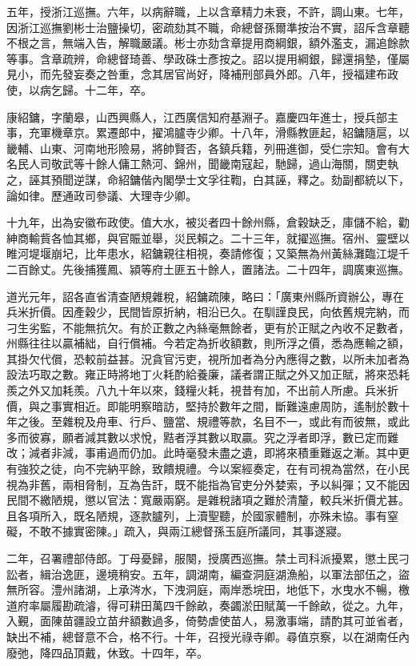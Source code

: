 \begin{pinyinscope}
五年，授浙江巡撫。六年，以病辭職，上以含章精力未衰，不許，調山東。七年，因浙江巡撫劉彬士治鹽操切，密疏劾其不職，命總督孫爾準按治不實，詔斥含章聽不根之言，無端入告，解職嚴議。彬士亦劾含章提用商綱銀，額外濫支，漏追餘款等事。含章疏辨，命總督琦善、學政硃士彥按之。詔以提用綱銀，歸還捐墊，僅屬見小，而先發妄奏之咎重，念其居官尚好，降補刑部員外郎。八年，授福建布政使，以病乞歸。十二年，卒。

康紹鏞，字蘭皋，山西興縣人，江西廣信知府基淵子。嘉慶四年進士，授兵部主事，充軍機章京。累遷郎中，擢鴻臚寺少卿。十八年，滑縣教匪起，紹鏞隨扈，以畿輔、山東、河南地形險易，將帥賢否，各鎮兵籍，列冊進御，受仁宗知。會有大名民人司敬武等十餘人傭工熱河、錦州，聞畿南寇起，馳歸，過山海關，關吏執之，誣其預聞逆謀，命紹鏞偕內閣學士文孚往鞫，白其誣，釋之。劾副都統以下，論如律。歷通政司參議、大理寺少卿。

十九年，出為安徽布政使。值大水，被災者四十餘州縣，倉穀缺乏，庫儲不給，勸紳商輸貲各恤其鄉，與官賑並舉，災民賴之。二十三年，就擢巡撫。宿州、靈壁以睢河堤堰崩圮，比年患水，紹鏞親往相視，奏請修復；又築無為州黃絲灘臨江堤千二百餘丈。先後捕獲鳳、潁等府土匪五十餘人，置諸法。二十四年，調廣東巡撫。

道光元年，詔各直省清查陋規雜稅，紹鏞疏陳，略曰：「廣東州縣所資辦公，專在兵米折價。因產穀少，民間皆原折納，相沿已久。在馴謹良民，向依舊規完納，而刁生劣監，不能無抗欠。有於正數之內絲毫無餘者，更有於正賦之內收不足數者，州縣往往以贏補絀，自行償補。今若定為折收額數，則所浮之價，悉為應輸之額，其掛欠代償，恐較前益甚。況貪官污吏，視所加者為分內應得之數，以所未加者為設法巧取之數。雍正時將地丁火耗酌給養廉，議者謂正賦之外又加正賦，將來恐耗羨之外又加耗羨。八九十年以來，錢糧火耗，視昔有加，不出前人所慮。兵米折價，與之事實相近。即能明察暗訪，堅持於數年之間，斷難遠慮周防，遙制於數十年之後。至雜稅及舟車、行戶、鹽當、規禮等款，名目不一，或此有而彼無，或此多而彼寡，願者減其數以求悅，黠者浮其數以取贏。究之浮者即浮，數已定而難改；減者非減，事甫過而仍加。此時毫發未盡之遺，即將來積重難返之漸。其中更有強狡之徒，向不完納平餘，致饋規禮。今以案經奏定，在有司視為當然，在小民視為非舊，兩相脅制，互為告訐，既不能指為官吏分外婪索，予以糾彈；又不能因民間不繳陋規，懲以官法：寬嚴兩窮。是雜稅諸項之難於清釐，較兵米折價尤甚。且各項所入，既名陋規，逐款臚列，上瀆聖聽，於國家體制，亦殊未協。事有窒礙，不敢不據實密陳。」疏入，與兩江總督孫玉庭所議同，其事遂寢。

二年，召署禮部侍郎。丁母憂歸，服闋，授廣西巡撫。禁土司科派擾累，懲土民刁訟者，緝治逸匪，邊境稍安。五年，調湖南，編查洞庭湖漁船，以軍法部伍之，盜無所容。澧州諸湖，上承涔水，下洩洞庭，兩岸悉垸田，地低下，水曳水不暢，檄道府率屬履勘疏濬，得可耕田萬四千餘畝，奏蠲淤田賦萬一千餘畝，從之。九年，入覲，面陳苗疆設立苗弁額數過多，倚勢虐使苗人，易激事端，請酌其可並省者，缺出不補，總督意不合，格不行。十年，召授光祿寺卿。尋值京察，以在湖南任內廢弛，降四品頂戴，休致。十四年，卒。


\end{pinyinscope}
